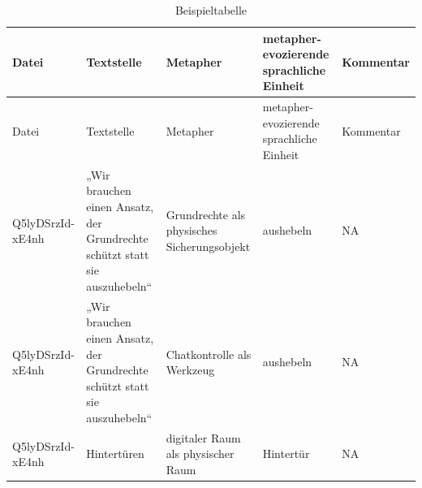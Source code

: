 \documentclass[
  letterpaper,
  DIV=11,
  numbers=noendperiod]{scrreprt}
\begin{document}
\begin{longtable}[]{@{}
  >{\raggedright\arraybackslash}p{}
  >{\raggedright\arraybackslash}p{}
  >{\raggedright\arraybackslash}p{}
  >{\raggedright\arraybackslash}p{}
  >{\raggedright\arraybackslash}p{}@{}}
\caption{Beispieltabelle}\tabularnewline
\toprule\noalign{}
\begin{minipage}[b]{\linewidth}\raggedright
Datei
\end{minipage} & \begin{minipage}[b]{\linewidth}\raggedright
Textstelle
\end{minipage} & \begin{minipage}[b]{\linewidth}\raggedright
Metapher
\end{minipage} & \begin{minipage}[b]{\linewidth}\raggedright
metapher-evozierende sprachliche Einheit
\end{minipage} & \begin{minipage}[b]{\linewidth}\raggedright
Kommentar
\end{minipage} \\
\midrule\noalign{}
\endfirsthead
\toprule\noalign{}
\begin{minipage}[b]{\linewidth}\raggedright
Datei
\end{minipage} & \begin{minipage}[b]{\linewidth}\raggedright
Textstelle
\end{minipage} & \begin{minipage}[b]{\linewidth}\raggedright
Metapher
\end{minipage} & \begin{minipage}[b]{\linewidth}\raggedright
metapher-evozierende sprachliche Einheit
\end{minipage} & \begin{minipage}[b]{\linewidth}\raggedright
Kommentar
\end{minipage} \\
\midrule\noalign{}
\endhead
\bottomrule\noalign{}
\endlastfoot
Q5lyDSrzId-xE4nh & „Wir brauchen einen Ansatz, der Grundrechte schützt
statt sie auszuhebeln`` & Grundrechte als physisches Sicherungsobjekt &
aushebeln & NA \\
Q5lyDSrzId-xE4nh & „Wir brauchen einen Ansatz, der Grundrechte schützt
statt sie auszuhebeln`` & Chatkontrolle als Werkzeug & aushebeln & NA \\
Q5lyDSrzId-xE4nh & Hintertüren & digitaler Raum als physischer Raum &
Hintertür & NA \\
\end{longtable}
\end{document}
